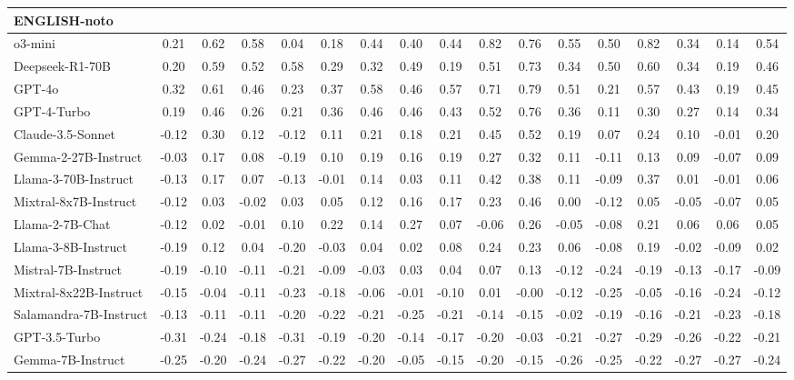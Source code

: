 \begin{table*}[ht]
{\begin{tabular}{lcccccccccccccccc}
ENGLISH-noto &&&&&&&&&&&&\\
\midrule
o3-mini & 0.21 & 0.62 & 0.58 & 0.04 & 0.18 & 0.44 & 0.40 & 0.44 & 0.82 & 0.76 & 0.55 & 0.50 & 0.82 & 0.34 & 0.14 & 0.54 \\
Deepseek-R1-70B & 0.20 & 0.59 & 0.52 & 0.58 & 0.29 & 0.32 & 0.49 & 0.19 & 0.51 & 0.73 & 0.34 & 0.50 & 0.60 & 0.34 & 0.19 & 0.46 \\
GPT-4o & 0.32 & 0.61 & 0.46 & 0.23 & 0.37 & 0.58 & 0.46 & 0.57 & 0.71 & 0.79 & 0.51 & 0.21 & 0.57 & 0.43 & 0.19 & 0.45 \\
GPT-4-Turbo & 0.19 & 0.46 & 0.26 & 0.21 & 0.36 & 0.46 & 0.46 & 0.43 & 0.52 & 0.76 & 0.36 & 0.11 & 0.30 & 0.27 & 0.14 & 0.34 \\
Claude-3.5-Sonnet & -0.12 & 0.30 & 0.12 & -0.12 & 0.11 & 0.21 & 0.18 & 0.21 & 0.45 & 0.52 & 0.19 & 0.07 & 0.24 & 0.10 & -0.01 & 0.20 \\
Gemma-2-27B-Instruct & -0.03 & 0.17 & 0.08 & -0.19 & 0.10 & 0.19 & 0.16 & 0.19 & 0.27 & 0.32 & 0.11 & -0.11 & 0.13 & 0.09 & -0.07 & 0.09 \\
Llama-3-70B-Instruct & -0.13 & 0.17 & 0.07 & -0.13 & -0.01 & 0.14 & 0.03 & 0.11 & 0.42 & 0.38 & 0.11 & -0.09 & 0.37 & 0.01 & -0.01 & 0.06 \\
Mixtral-8x7B-Instruct & -0.12 & 0.03 & -0.02 & 0.03 & 0.05 & 0.12 & 0.16 & 0.17 & 0.23 & 0.46 & 0.00 & -0.12 & 0.05 & -0.05 & -0.07 & 0.05 \\
Llama-2-7B-Chat & -0.12 & 0.02 & -0.01 & 0.10 & 0.22 & 0.14 & 0.27 & 0.07 & -0.06 & 0.26 & -0.05 & -0.08 & 0.21 & 0.06 & 0.06 & 0.05 \\
Llama-3-8B-Instruct & -0.19 & 0.12 & 0.04 & -0.20 & -0.03 & 0.04 & 0.02 & 0.08 & 0.24 & 0.23 & 0.06 & -0.08 & 0.19 & -0.02 & -0.09 & 0.02 \\
Mistral-7B-Instruct & -0.19 & -0.10 & -0.11 & -0.21 & -0.09 & -0.03 & 0.03 & 0.04 & 0.07 & 0.13 & -0.12 & -0.24 & -0.19 & -0.13 & -0.17 & -0.09 \\
Mixtral-8x22B-Instruct & -0.15 & -0.04 & -0.11 & -0.23 & -0.18 & -0.06 & -0.01 & -0.10 & 0.01 & -0.00 & -0.12 & -0.25 & -0.05 & -0.16 & -0.24 & -0.12 \\
Salamandra-7B-Instruct & -0.13 & -0.11 & -0.11 & -0.20 & -0.22 & -0.21 & -0.25 & -0.21 & -0.14 & -0.15 & -0.02 & -0.19 & -0.16 & -0.21 & -0.23 & -0.18 \\
GPT-3.5-Turbo & -0.31 & -0.24 & -0.18 & -0.31 & -0.19 & -0.20 & -0.14 & -0.17 & -0.20 & -0.03 & -0.21 & -0.27 & -0.29 & -0.26 & -0.22 & -0.21 \\
Gemma-7B-Instruct & -0.25 & -0.20 & -0.24 & -0.27 & -0.22 & -0.20 & -0.05 & -0.15 & -0.20 & -0.15 & -0.26 & -0.25 & -0.22 & -0.27 & -0.27 & -0.24 \\

\end{tabular}}
\end{table*}
